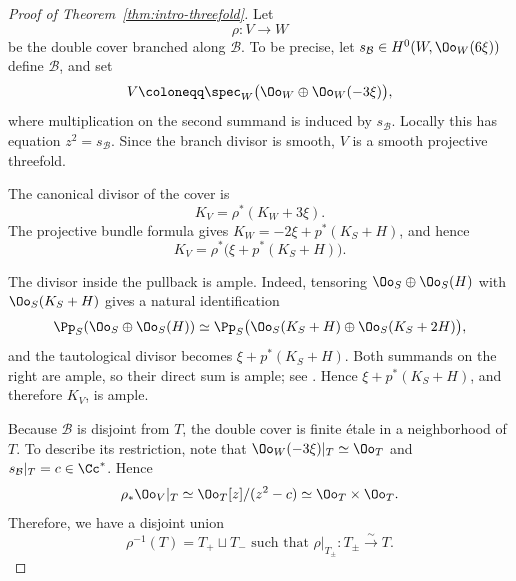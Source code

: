 \documentclass[12pt]{amsart}
\begin{document}
\begin{proof}[Proof of Theorem~\ref{thm:intro-threefold}]
Let 
\[\rho\colon V\to W\] be the double cover branched along $\mathcal B$. To be precise, let $s_{\mathcal B}\in H^0(W,\Oo_W(6\xi))$ define $\mathcal B$, and set
\[
 V\coloneqq\spec_W\bigl(\Oo_W\oplus\Oo_W(-3\xi)\bigr),
\]
where multiplication on the second summand is induced by $s_{\mathcal B}$. Locally this has equation $z^2=s_{\mathcal B}$. Since the branch divisor is smooth, $V$ is a smooth projective threefold.

The canonical divisor of the cover is
\begin{equation}\label{eq:KV-first}
 K_V=\rho^*(K_W+3\xi).
\end{equation}
The projective bundle formula gives $K_W=-2\xi+p^*(K_S+H)$, and hence
\begin{equation}\label{eq:KV}
 K_V=\rho^*\bigl(\xi+p^*(K_S+H)\bigr).
\end{equation}

The divisor inside the pullback is ample. Indeed, tensoring
$\Oo_S\oplus\Oo_S(H)$ with $\Oo_S(K_S+H)$ gives a natural identification
\[
 \Pp_S(\Oo_S\oplus\Oo_S(H))
 \simeq
 \Pp_S\bigl(\Oo_S(K_S+H)\oplus\Oo_S(K_S+2H)\bigr),
\]
and the tautological divisor becomes $\xi+p^*(K_S+H)$. Both summands on the right are ample, so their direct sum is ample; see \cite[Proposition~6.1.13]{Laz04II}. Hence $\xi+p^*(K_S+H)$, and therefore $K_V$, is ample.

Because $\mathcal B$ is disjoint from $T$, the double cover is finite étale in a neighborhood of $T$. To describe its restriction, note that $\Oo_W(-3\xi)|_T\simeq\Oo_T$ and $s_{\mathcal B}|_T=c\in\Cc^*$. Hence
\[
 \rho_*\Oo_V|_T\simeq\Oo_T[z]/(z^2-c)\simeq\Oo_T\times\Oo_T.
\]
Therefore, we have a disjoint union
\begin{equation}\label{eq:split-over-T}
 \rho^{-1}(T)=T_+\sqcup T_- \text{~such that~}
 \rho|_{T_\pm}\colon T_\pm\xrightarrow{\sim}T.
\end{equation}


\end{proof}
\end{document}

